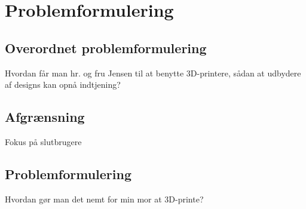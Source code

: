 \chapter{Problemformulering} %
\label{cha:problemformulering}

\section{Overordnet problemformulering} %


Hvordan får man hr. og fru Jensen til at benytte 3D-printere, sådan at udbydere af designs kan opnå indtjening?

\section{Afgrænsning} %

Fokus på slutbrugere

\section{Problemformulering} %

Hvordan gør man det nemt for min mor at 3D-printe?

